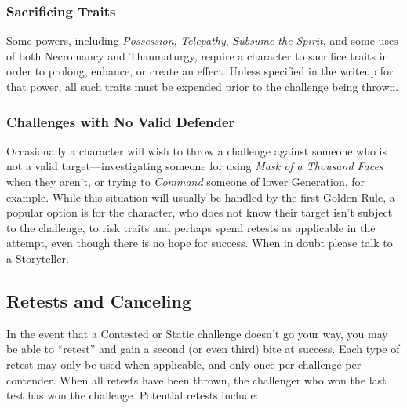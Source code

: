 \subsubsection{Sacrificing Traits}
Some powers, including \emph{Possession}, \emph{Telepathy}, \emph{Subsume the Spirit}, and some uses of both 
Necromancy and Thaumaturgy, require a character to sacrifice traits in order to prolong, enhance, or create 
an effect.  Unless specified in the writeup for that power, all such traits must be expended prior to the 
challenge being thrown.

\subsubsection{Challenges with No Valid Defender}
Occasionally a character will wish to throw a challenge against someone who is not a valid 
target---investigating someone for using \emph{Mask of a Thousand Faces} when they aren't, or trying 
to \emph{Command} someone of lower Generation, for example.  While this situation will usually be handled 
by the first Golden Rule, a popular option is for the character, who does not know their target isn't 
subject to the challenge, to risk traits and perhaps spend retests as applicable in the attempt, even 
though there is no hope for success.  When in doubt please talk to a Storyteller.

\subsection{Retests and Canceling}
In the event that a Contested or Static challenge doesn't go your way, you may be able to ``retest'' and 
gain a second (or even third) bite at success.  Each type of retest may only be used when applicable, and 
only once per challenge per contender.  When all retests have been thrown, the challenger who won the last 
test has won the challenge.  Potential retests include:

